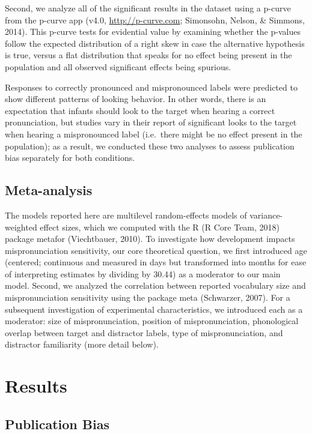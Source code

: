\documentclass[man]{apa6}
\begin{document}
Second, we analyze all of the significant results in the dataset using a p-curve from the p-curve app (v4.0, \url{http://p-curve.com}; Simonsohn, Nelson, \& Simmons, 2014). This p-curve tests for evidential value by examining whether the p-values follow the expected distribution of a right skew in case the alternative hypothesis is true, versus a flat distribution that speaks for no effect being present in the population and all observed significant effects being spurious.

Responses to correctly pronounced and mispronounced labels were predicted to show different patterns of looking behavior. In other words, there is an expectation that infants should look to the target when hearing a correct pronunciation, but studies vary in their report of significant looks to the target when hearing a mispronounced label (i.e.~there might be no effect present in the population); as a result, we conducted these two analyses to assess publication bias separately for both conditions.

\hypertarget{meta-analysis}{%
\subsection{Meta-analysis}\label{meta-analysis}}

The models reported here are multilevel random-effects models of variance-weighted effect sizes, which we computed with the R (R Core Team, 2018) package metafor (Viechtbauer, 2010). To investigate how development impacts mispronunciation sensitivity, our core theoretical question, we first introduced age (centered; continuous and measured in days but transformed into months for ease of interpreting estimates by dividing by 30.44) as a moderator to our main model. Second, we analyzed the correlation between reported vocabulary size and mispronunciation sensitivity using the package meta (Schwarzer, 2007). For a subsequent investigation of experimental characteristics, we introduced each as a moderator: size of mispronunciation, position of mispronunciation, phonological overlap between target and distractor labels, type of mispronunciation, and distractor familiarity (more detail below).

\hypertarget{results}{%
\section{Results}\label{results}}

\hypertarget{publication-bias-1}{%
\subsection{Publication Bias}\label{publication-bias-1}}
\end{document}
